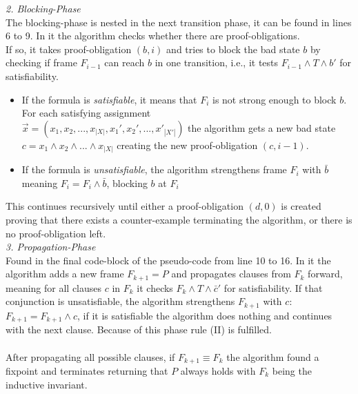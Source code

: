 \documentclass[11pt, a4paper, BCOR=10mm, ngerman]{scrbook}
\begin{document}
\textsl{2. Blocking-Phase} \\ The blocking-phase is nested in the next transition phase, it can be found in lines 6 to 9. In it the algorithm checks whether there are proof-obligations. \\ If so, 
it takes proof-obligation $(b, i)$ and tries to block the bad state $b$ by checking if frame $F_{i-1}$ can reach $b$ in one transition, i.e., it tests $F_{i-1} \land T \land b'$ for satisfiability.

\begin{itemize}
\item If the formula is \textsl{satisfiable}, it means that $F_{i}$ is not strong enough to block $b$. For each satisfying assignment \\ $\vec{x} = (x_1, x_2, ..., x_{|X|}, x_1', x_2', ..., x'_{|X'|})$ the algorithm gets a new bad state \\ $c = x_1 \land x_2 \land ... \land x_{|X|}$ creating the new proof-obligation $(c, i-1)$.

\item If the formula is \textsl{unsatisfiable}, the algorithm strengthens frame $F_{i}$ with $\bar b$ meaning $F_i = F_i \land \bar b$, blocking $b$ at $F_{i}$ 

\end{itemize}

This continues recursively until either a proof-obligation $(d, 0)$ is created proving that there exists a counter-example terminating the algorithm, or
there is no proof-obligation left. \\

\textsl{3. Propagation-Phase}\\ Found in the final code-block of the pseudo-code from line 10 to 16. In it the algorithm adds a new frame $F_{k + 1} = P$ and propagates clauses from $F_{k}$ forward, meaning for all clauses $c$ in $F_{k}$ it checks $F_{k} \land T \land \bar c'$ for satisfiability. If that conjunction is unsatisfiable, the algorithm strengthens $F_{k+1}$ with $c$: $F_{k+1} = F_{k+1} \land c$, if it is satisfiable the algorithm does nothing and continues with the next clause. Because of this phase rule (II) is fulfilled.\\ \\
After propagating all possible clauses, if $F_{k+1} \equiv F_{k}$ the algorithm found a fixpoint and terminates returning that $P$ always holds with $F_k$ being the inductive invariant. \\ \\
\end{document}
